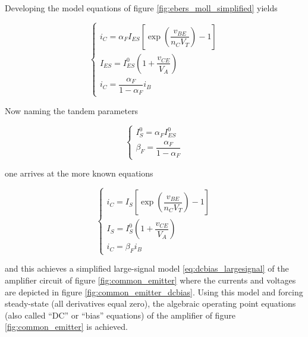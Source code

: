 	Developing the model equations of figure \ref{fig:ebers_moll_simplified} yields

\begin{equation}
	\left\{\begin{array}{l}
		i_C = \alpha_F I_{ES}\left[\exp\left(\dfrac{v_{BE}}{n_CV_T}\right) - 1\right] \\[3mm]
		I_{ES} = I_{ES}^0 \left(1 + \dfrac{v_{CE}}{V_A}\right) \\[5mm]
		i_C = \dfrac{\alpha_F}{1 - \alpha_F} i_B
	\end{array}\right. \label{eq:simple_ebers_moll_developed}
\end{equation}

	Now naming the tandem parameters

\begin{equation}
	\left\{\begin{array}{l}
		I_S^0 = \alpha_F I_{ES}^0 \\[3mm]
		\beta_F = \dfrac{\alpha_F}{1 - \alpha_F}
	\end{array}\right. \label{eq:simple_ebers_moll_params}
\end{equation}

	\noindent one arrives at the more known equations

\begin{equation}
	\left\{\begin{array}{l}
		i_C = I_{S}\left[\exp\left(\dfrac{v_{BE}}{n_CV_T}\right) - 1\right] \\[5mm]
		I_{S} = I_{S}^0 \left(1 + \dfrac{v_{CE}}{V_A}\right) \\[5mm]
		i_C = \beta_F i_B
	\end{array}\right. \label{eq:simple_ebers_moll_new_params}
\end{equation}

	\noindent and this achieves a simplified large-signal model \eqref{eq:dcbias_largesignal} of the amplifier circuit of figure \ref{fig:common_emitter} where the currents and voltages are depicted in figure \ref{fig:common_emitter_dcbias}. Using this model and forcing steady-state (all derivatives equal zero), the algebraic operating point equations (also called ``DC'' or ``bias'' equations) of the amplifier of figure \ref{fig:common_emitter} is achieved.

